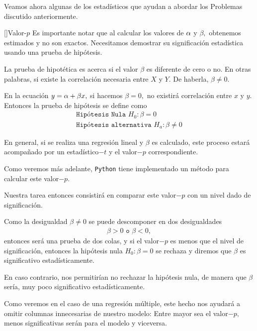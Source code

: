 Veamos ahora algunas de los estadísticos que ayudan a abordar los Problemas
discutido anteriormente.

[]{Valor-$p$}
Es importante notar que al calcular los valores de $\alpha$ y $\beta,$ obtenemos estimados y no son exactos. Necesitamos demostrar su significación estadística usando una prueba de hipótesis.


La prueba de hipotética es acerca si el valor $\beta$ es diferente de cero o no. En otras palabras, si existe la correlación necesaria entre $X$ y $Y$. De haberla, $\beta \neq 0$.


En la ecuación $y = \alpha + \beta x,$ si hacemos $\beta=0,$ no existirá correlación entre $x$ y $y$. Entonces la prueba de hipótesis se define como
\begin{align}
	\texttt{Hipótesis Nula }H_{0}:\beta=0 \\
	\texttt{Hipótesis alternativa }H_{a}: \beta \neq 0
\end{align}




En general, si se realiza una regresión lineal y $\beta $ es calculado, este proceso estará acompañado por un estadístico$-t$ y el valor$-p$ correspondiente.



Como veremos más adelante, \texttt{Python} tiene implementado un método para calcular este valor$-p$.



Nuestra tarea entonces consistirá en comparar este valor$-p$ con un nivel dado de significación.



Como la desigualdad $\beta\neq 0$ se puede descomponer en dos desigualdades
\begin{align}
	\beta>0 \texttt{ o }\beta<0,
\end{align}
entonces será una prueba de dos colas, y si el valor$-p$ es menos que el nivel de significación, entonces la hipótesis nula $H_{0}: \beta = 0$ se rechaza y diremos que $\beta$ es significativo estadísticamente.



En caso contrario, nos permitirían no rechazar la hipótesis nula, de manera que $\beta$ sería, muy poco significativo estadísticamente.



Como veremos en el caso de una regresión múltiple, este hecho nos ayudará a omitir columnas innecesarias de nuestro modelo: Entre mayor sea el valor$-p,$ menos significativas serán para el modelo y viceversa.


